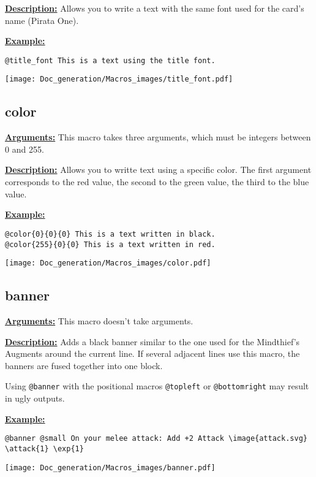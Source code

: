 \documentclass{article}
\begin{document}
\textbf{\underline{Description:}} Allows you to write a text with the same font used for the card's name (Pirata One).

\textbf{\underline{Example:}}

\begin{center}
\begin{BVerbatim}
@title_font This is a text using the title font.
\end{BVerbatim}

\texttt{[image: Doc\_generation/Macros\_images/title\_font.pdf]}
\end{center}

\subsection{color}
\textbf{\underline{Arguments:}} This macro takes three arguments, which must be integers between 0 and 255.

\textbf{\underline{Description:}} Allows you to writte text using a specific color. The first argument corresponds to the red value, the second to the green value, the third to the blue value.

\textbf{\underline{Example:}}

\begin{center}
\begin{BVerbatim}
@color{0}{0}{0} This is a text written in black.
@color{255}{0}{0} This is a text written in red.
\end{BVerbatim}

\texttt{[image: Doc\_generation/Macros\_images/color.pdf]}
\end{center}

\pagebreak

\subsection{banner}
\textbf{\underline{Arguments:}} This macro doesn't take arguments.

\textbf{\underline{Description:}} Adds a black banner similar to the one used for the Mindthief's Augments around the current line. If several adjacent lines use this macro, the banners are fused together into one block.

Using \verb'@banner' with the positional macros \verb'@topleft' or \verb'@bottomright' may result in ugly outputs.

\textbf{\underline{Example:}}
\begin{center}
\begin{BVerbatim}
@banner @small On your melee attack: Add +2 Attack \image{attack.svg}
\attack{1} \exp{1}
\end{BVerbatim}

\texttt{[image: Doc\_generation/Macros\_images/banner.pdf]}
\end{center}
\end{document}
